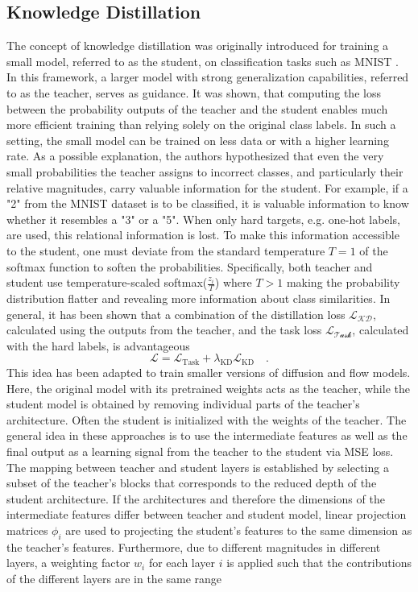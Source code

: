 \subsection{Knowledge Distillation}
\label{sec:BackgroundKnowledgeDistillation}
The concept of knowledge distillation \cite{KnowledgeDistillation} was originally introduced for training a small model, referred to as the student, on classification tasks such as MNIST \cite{MNIST}. In this framework, a larger model with strong generalization capabilities, referred to as the teacher, serves as guidance. It was shown, that computing the loss between the probability outputs of the teacher and the student enables much more efficient training than relying solely on the original class labels. In such a setting, the small model can be trained on less data or with a higher learning rate. As a possible explanation, the authors hypothesized that even the very small probabilities the teacher assigns to incorrect classes, and particularly their relative magnitudes, carry valuable information for the student. For example, if a "2" from the MNIST dataset is to be classified, it is valuable information to know whether it resembles a "3" or a "5". When only hard targets, e.g. one-hot labels,  are used, this relational information is lost. To make this information accessible to the student, one must deviate from the standard temperature $T=1$ of the softmax function to soften the probabilities. Specifically, both teacher and student use temperature-scaled softmax($\frac{z_i}{T}$) where $T > 1$ making the probability distribution flatter and revealing more information about class similarities. In general, it has been shown that a combination of the distillation loss $\mathcal{L_\text{KD}}$, calculated using the outputs from the teacher, and the task loss $\mathcal{L_\text{Task}}$, calculated with the hard labels, is advantageous
\begin{equation}
	\mathcal{L} = \mathcal{L}_\text{Task} + \lambda_\text{KD}\mathcal{L}_\text{KD} \quad.
\end{equation}
This idea has been adapted to train smaller versions of diffusion \cite{Bksdm,Laptop, Koala}  and flow \cite{FastFlux,TinyFusion, PPCL,Dense2MoE,flux1-lite,flux_mini_2024} models. Here, the original model with its pretrained weights acts as the teacher, while the student model is obtained by removing individual parts of the teacher's architecture. Often the student is initialized with the weights of the teacher. The general idea in these approaches is to use the intermediate features as well as the final output as a learning signal from the teacher to the student via \gls{MSE} loss. The mapping between teacher and student layers is established by selecting a subset of the teacher's blocks that corresponds to the reduced depth of the student architecture. If the architectures and therefore the dimensions of the intermediate features differ between teacher and student model, linear projection matrices $\phi_i$ are used to projecting the student's features to the same dimension as the teacher's features. Furthermore, due to different magnitudes in different layers, a weighting factor $w_i$ for each layer $i$ is applied such that the contributions of the different layers are in the same range

